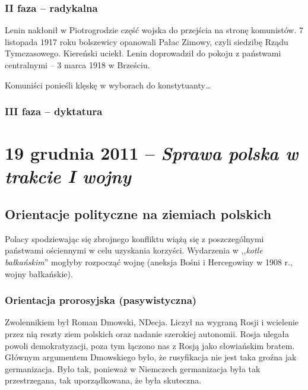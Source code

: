 \documentclass [a4paper, 11pt, oneside]{book}
\begin{document}
        \subsection{II faza -- radykalna} %
        \label{sub:ii_faza_radykalna}
            Lenin nakłonił w Piotrogrodzie część wojska do przejścia na stronę komunistów. 7 listopada 1917 roku bolszewicy opanowali Pałac Zimowy, czyli siedzibę Rządu Tymczasowego. Kiereński uciekł. Lenin doprowadził do pokoju z państwami centralnymi -- 3 marca 1918 w Brześciu.

            Komuniści ponieśli klęskę w wyborach do konstytuanty\dots
        \subsection{III faza -- dyktatura} %
        \label{sub:iii_faza_dyktatura}
            
\chapter{19 grudnia 2011 -- \textit{Sprawa polska w trakcie I wojny}} %
\label{cha:sprawa_polska_w_trakcie_i_wojny}
    \section{Orientacje polityczne na ziemiach polskich} %
    \label{sec:orientacje_polityczne_na_ziemiach_polskich}
        Polacy spodziewając się zbrojnego konfliktu wiążą się z poszczególnymi państwami ościennymi w celu uzyskania korzyści. Wydarzenia w ,,\emph{kotle bałkańskim}'' mogłyby rozpocząć wojnę (aneksja Bośni i Hercegowiny w 1908 r., wojny bałkańskie).
        \subsection{Orientacja prorosyjska (pasywistyczna)} %
        \label{sub:orientacja_prorosyjska}
            Zwolennikiem był Roman Dmowski, NDecja. Liczył na wygraną Rosji i wcielenie przez nią reszty ziem polskich oraz nadanie szerokiej autonomii. Rosja ulegała powoli demokratyzacji, poza tym łączono nas z Rosją jako słowiańskim bratem. Głównym argumentem Dmowskiego było, że rusyfikacja nie jest taka groźna jak germanizacja. Było tak, ponieważ w Niemczech germanizacja była tak przestrzegana, tak uporządkowana, że była skuteczna.
\end{document}
